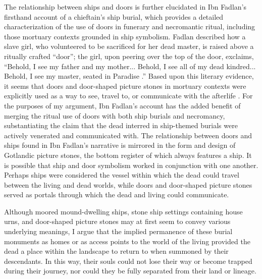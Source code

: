 The relationship between ships and doors is further elucidated in Ibn Fadlan’s firsthand account of a chieftain’s ship burial, which provides a detailed characterization of the use of doors in funerary and necromantic ritual, including those mortuary contexts grounded in ship symbolism. Fadlan described how a slave girl, who volunteered to be sacrificed for her dead master, is raised above a ritually crafted “door”; the girl, upon peering over the top of the door, exclaims, “Behold, I see my father and my mother... Behold, I see all of my dead kindred... Behold, I see my master, seated in Paradise \parencite[17-18]{Montgomery_2000}.”
Based upon this literary evidence, it seems that doors and door-shaped picture stones in mortuary contexts were explicitly used as a way to see, travel to, or communicate with the afterlife \parencite{Price_2012a}. For the purposes of my argument, Ibn Fadlan’s account has the added benefit of merging the ritual use of doors with both ship burials and necromancy, substantiating the claim that the dead interred in ship-themed burials were actively venerated and communicated with. The relationship between doors and ships found in Ibn Fadlan’s narrative is mirrored in the form and design of Gotlandic picture stones, the bottom register of which always features a ship. It is possible that ship and door symbolism worked in conjunction with one another. Perhaps ships were considered the vessel within which the dead could travel between the living and dead worlds, while doors and door-shaped picture stones served as portals through which the dead and living could communicate.

Although moored mound-dwelling ships, stone ship settings containing house urns, and door-shaped picture stones may at first seem to convey various underlying meanings, I argue that the implied permanence of these burial monuments as homes or as access points to the world of the living provided the dead a place within the landscape to return to when summoned by their descendants. In this way, their souls could not lose their way or become trapped during their journey, nor could they be fully separated from their land or lineage.

